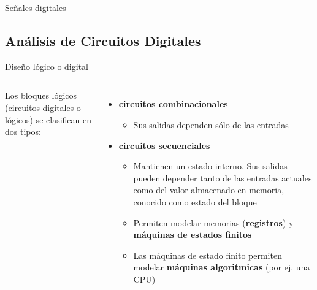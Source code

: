 \documentclass[aspectratio=169,compress]{beamer}
\begin{document}
\begin{footnotesize}
\begin{frame}{Señales digitales}
\begin{itemize}
\end{itemize}
\end{frame}


\subsection{Análisis de Circuitos Digitales}

\begin{frame}{Diseño lógico o digital}

\bigskip

 \begin{columns}[onlytextwidth,T]
      \column{\dimexpr\linewidth-60mm-5mm}

Los bloques lógicos (circuitos digitales o lógicos) se 
clasifican en dos tipos:
\begin{itemize}
\item \textbf{circuitos combinacionales}
\begin{itemize}
\item Sus salidas dependen sólo de las entradas
\end{itemize}
\item \textbf{circuitos secuenciales}

\begin{itemize}
\item Mantienen un estado interno. Sus salidas pueden 
depender tanto de las entradas actuales como
del valor almacenado en memoria, conocido 
como estado del bloque
\item Permiten modelar memorias (\textbf{registros}) y \textbf{máquinas de estados finitos}
\item Las máquinas de estado finito permiten modelar \textbf{máquinas algoritmicas} (por ej. una CPU)
\end{itemize}

\end{itemize}


\end{columns}
\end{frame}
\end{footnotesize}
\end{document}
